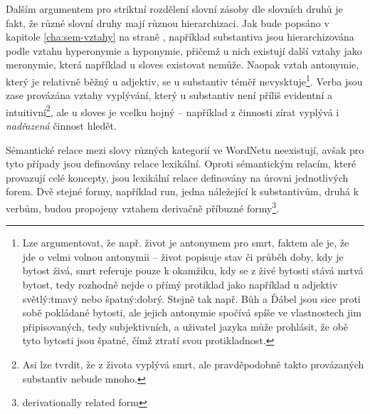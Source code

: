 \documentclass[a4paper, 11pt, oneside]{book}
\newcommand\ex{\textsf}
\begin{document}
					Dalším argumentem pro striktní rozdělení slovní zásoby dle slovních druhů je fakt, že různé slovní druhy mají různou hierarchizaci. Jak bude popsáno v kapitole \ref{cha:sem-vztahy} na straně \pageref{cha:sem-vztahy}, například substantiva jsou hierarchizována podle vztahu hyperonymie a hyponymie, přičemž u nich existují další vztahy jako meronymie, která například u sloves existovat nemůže. Naopak vztah antonymie, který je relativně běžný u adjektiv, se u substantiv téměř nevysktuje\footnote{Lze argumentovat, že např. \ex{život} je antonymem pro \ex{smrt}, faktem ale je, že jde o velmi volnou antonymii -- život popisuje stav či průběh doby, kdy je bytost živá, smrt referuje pouze k okamžiku, kdy se z živé bytosti stává mrtvá bytost, tedy rozhodně nejde o přímý protiklad jako například u adjektiv \ex{světlý:tmavý} nebo \ex{špatný:dobrý}. Stejně tak např. \ex{Bůh} a \ex{Ďábel} jsou sice proti sobě pokládané bytosti, ale jejich antonymie spočívá spíše ve vlastnostech jim připisovaných, tedy subjektivních, a uživatel jazyka může prohlásit, že obě tyto bytosti jsou špatné, čímž ztratí svou protikladnost.}. Verba jsou zase provázána vztahy vyplývání, který u substantiv není příliš evidentní a intuitivní\footnote{Asi lze tvrdit, že z \ex{života} vyplývá \ex{smrt}, ale pravděpodobně takto provázaných substantiv nebude mnoho.}, ale u sloves je vcelku hojný -- například z činnosti \ex{zírat} vyplývá i \textit{nadřazená} činnost \ex{hledět}.

					Sémantické relace mezi slovy různých kategorií ve WordNetu neexistují, avšak pro tyto případy jsou definovány relace lexikální. Oproti sémantickým relacím, které provazují celé koncepty, jsou lexikální relace definovány na úrovni jednotlivých forem. Dvě stejné formy, například \ex{run}, jedna náležející k substantivům, druhá k verbům, budou propojeny vztahem derivačně příbuzné formy\footnote{derivationally related form}. \parencite{wndocsWNgloss}


\end{document}
